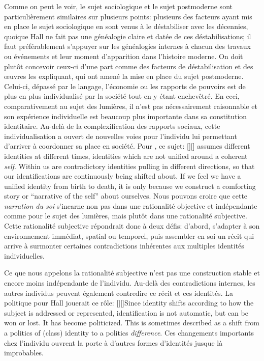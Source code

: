 Comme on peut le voir, le sujet sociologique et le sujet postmoderne sont particulièrement similaires sur plusieurs points: plusieurs des facteurs ayant mis en place le sujet sociologique en sont venus à le déstabiliser avec les décennies, quoique Hall ne fait pas une généalogie claire et datée de ces déstabilisations; il faut préférablement s'appuyer sur les généalogies internes à chacun des travaux ou événements et leur moment d'apparition dans l'histoire moderne.
On doit plutôt concevoir ceux-ci d'une part comme des facteurs de déstabilisation et des œuvres les expliquant, qui ont amené la mise en place du sujet postmoderne. Celui-ci, dépassé par le langage, l'économie ou les rapports de pouvoirs est de plus en plus individualisé par la société tout en y étant enchevêtré. 
En ceci, comparativement au sujet des lumières, il n'est pas nécessairement raisonnable et son expérience individuelle est beaucoup plus importante dans sa constitution identitaire. Au-delà de la complexification des rapports sociaux, cette individualisation a ouvert de nouvelles voies pour l'individu lui permettant d'arriver à coordonner sa place en société. 
Pour \citeauthor{Hall1996a}, ce sujet: [{\citeyear[598]{Hall1996a}}][]{\textelp{} assumes different identities at different times, identities which are not unified around a coherent \emph{self}. Within us are contradictory identities pulling in different directions, so that our identifications are continuously being shifted about. If we feel we have a unified identity from birth to death, it is only because we construct a comforting story or ``narrative of the self'' about ourselves}. 
Nous pouvons croire que cette \emph{narration du soi} s'incarne non pas dans une rationalité objective et indépendante comme pour le sujet des lumières, mais plutôt dans une rationalité subjective. 
Cette rationalité subjective répondrait donc à deux défis: d'abord, s'adapter à son environnement immédiat, spatial ou temporel, puis assembler en soi un récit qui arrive à surmonter certaines contradictions inhérentes aux multiples identités individuelles.

Ce que nous appelons la rationalité subjective n'est pas une construction stable et encore moins indépendante de l'individu.
Au-delà des contradictions internes, les autres individus peuvent également contredire ce récit et ces identités.
La politique pour Hall jouerait ce rôle: [{\citeyear[610]{Hall1996a}}][]{Since identity shifts according to how the subject is addressed or represented, identification is not automatic, but can be won or lost. It has become politicized. This is sometimes described as a shift from a politics of (class) identity to a politics \emph{difference}}.
Ces changements importants chez l'individu ouvrent la porte à d'autres formes d'identités jusque là improbables.

